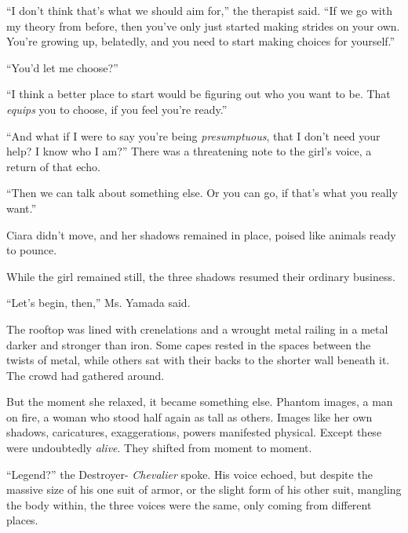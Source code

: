 ``I don't think that's what we should aim for,'' the therapist said.  ``If we go with my theory from before, then you've only just started making strides on your own.  You're growing up, belatedly, and you need to start making choices for yourself.''



``You'd let me choose?''



``I think a better place to start would be figuring out who you want to be.  That \emph{equips} you to choose, if you feel you're ready.''



``And what if I were to say you're being \emph{presumptuous}, that I don't need your help?  I know who I am?''  There was a threatening note to the girl's voice, a return of that echo.



``Then we can talk about something else.  Or you can go, if that's what you really want.''



Ciara didn't move, and her shadows remained in place, poised like animals ready to pounce.



While the girl remained still, the three shadows resumed their ordinary business.



``Let's begin, then,'' Ms. Yamada said.



\sectionbreak



The rooftop was lined with crenelations and a wrought metal railing in a metal darker and stronger than iron.  Some capes rested in the spaces between the twists of metal, while others sat with their backs to the shorter wall beneath it.  The crowd had gathered around.



But the moment she relaxed, it became something else.  Phantom images, a man on fire, a woman who stood half again as tall as others.  Images like her own shadows, caricatures, exaggerations, powers manifested physical.  Except these were undoubtedly \emph{alive}.  They shifted from moment to moment.



``Legend?'' the Destroyer- \emph{Chevalier} spoke.  His voice echoed, but despite the massive size of his one suit of armor, or the slight form of his other suit, mangling the body within, the three voices were the same, only coming from different places.



